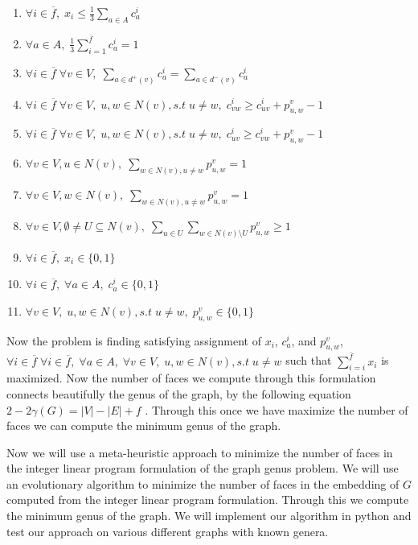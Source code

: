 \documentclass{article}
\begin{document}
    \begin{enumerate}
        \item $\forall i \in \overline{f},\; x_i  \leq \frac{1}{3}\sum_{a \in A} c^i_a$
        \item $\forall a \in A,\; \frac{1}{3}\sum_{i = 1}^{\overline{f}} c^i_a = 1$
        \item $\forall i \in \overline{f} \;\forall v \in V,\; \sum_{a \in d^+(v)} c^i_a = \sum_{a \in d^-(v)} c^i_a$
        \item $\forall i \in \overline{f} \;\forall v \in V,\; u,w \in N(v), s.t\; u \neq w,\; c^i_{vw} \geq c^i_{uv} + p^v_{u,w} - 1$
        \item $\forall i \in \overline{f} \;\forall v \in V,\; u,w \in N(v), s.t\; u \neq w,\; c^i_{uv} \geq c^i_{vw} + p^v_{u,w} - 1$
        \item $\forall v \in V, u \in N(v), \; \sum_{w \in N(v), u \neq w} p^v_{u, w} = 1$
        \item $\forall v \in V, w \in N(v), \; \sum_{w \in N(v), u \neq w} p^v_{u, w} = 1$
        \item $\forall v \in V, \emptyset \neq U \subseteq N(v), \; \sum_{u \in U}\sum_{w \in N(v)\setminus U} p^v_{u, w} \geq 1$
        \item $\forall i \in \overline{f},\; x_i  \in \{0,1\}$
        \item $\forall i \in \overline{f},\; \forall a\in A,\; c_a^i  \in \{0,1\}$
        \item $\forall v \in V,\; u,w \in N(v), s.t\; u \neq w,\; p^v_{u, w}  \in \{0,1\}$
    \end{enumerate}
    Now the problem is finding satisfying assignment of $x_i$, $c_a^i$, and $p^v_{u, w}$, $\forall i \in \overline{f} \; \forall i \in \overline{f},\; \forall a\in A, \; \forall v \in V,\; u,w \in N(v), s.t\; u \neq w$ such that $\sum^{\overline{f}}_{i = i} x_i$ is maximized.
    Now the number of faces we compute through this formulation connects beautifully the genus of the graph, by the following equation $2 - 2\gamma(G) = |V| - |E| + f$ \cite{Massey91}.
    Through this once we have maximize the number of faces we can compute the minimum genus of the graph.
    
    Now we will use a meta-heuristic approach to minimize the number of faces in the integer linear program formulation of the graph genus problem. We will use an evolutionary algorithm to minimize the number of faces in the embedding of $G$ computed from the integer linear program formulation.
    Through this we compute the minimum genus of the graph. We will implement our algorithm in python and test our approach on various different graphs with known genera.

 

\end{document}
